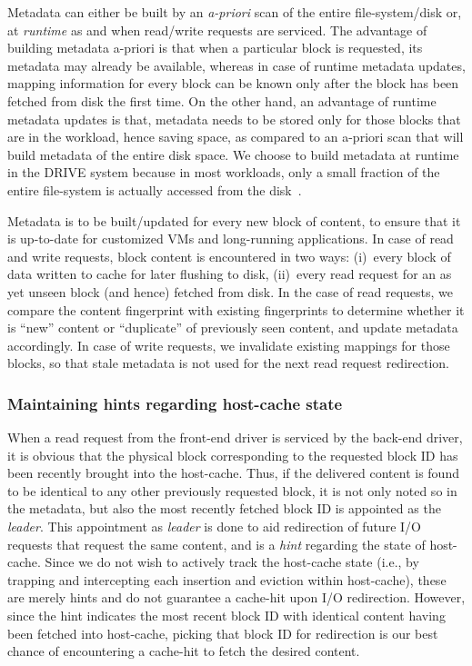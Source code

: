 Metadata can either be built by an \textit{a-priori} scan of the entire
file-system/disk or, at \textit{runtime} as and when read/write
requests are serviced. The advantage of building metadata a-priori is that
when a particular block is requested, its metadata may already be
available,
whereas in case of runtime metadata updates, mapping information for
every block can be known only after the block has been fetched from disk
the first time.
On the other hand, an advantage of runtime metadata updates is that,
metadata needs to be stored only for those blocks that are in the workload,
hence saving space, as compared to an a-priori scan that will build metadata
of the entire disk space. We choose to build metadata at runtime in the
DRIVE system because in most workloads, only a small fraction of the 
entire file-system is actually accessed from the disk~\cite{iodedup}.

Metadata is to be built/updated for every new block of content, to ensure that
it is up-to-date for customized VMs and long-running applications.
In case of read and write requests, block content is encountered in two ways:
(i)~every block of data written to cache for later flushing to disk,
(ii)~every read request for an as yet unseen block (and hence) fetched
from disk. 
In the case of read requests, we compare the 
content fingerprint
with existing fingerprints to determine
whether it is ``new'' content or ``duplicate'' of previously seen content,
and update metadata accordingly.
In case of write requests, we invalidate existing mappings for those blocks,
so that stale metadata is not used for the next read request redirection.

\subsubsection{Maintaining hints regarding host-cache state}
When a read request from the front-end driver is serviced by the back-end
driver, it is obvious that the physical block
corresponding to the requested
block ID has been recently brought into the host-cache. Thus, if the delivered
content is found to be identical to any other previously requested block, it 
is not only noted 
so in the metadata, but also the most recently fetched block ID is appointed
as the \textit{leader}. This appointment as \textit{leader} is done to aid
redirection of future I/O requests that request the same content, and is
a \textit{hint} regarding the state of host-cache.
Since we do not wish to actively track the host-cache state (i.e., by
trapping and intercepting each insertion and eviction within host-cache), 
these are merely hints and do not guarantee a cache-hit upon I/O redirection.
However, since the hint indicates the most recent block ID with identical
content having been fetched into host-cache, picking that block ID for 
redirection is our best chance of encountering a cache-hit to fetch the 
desired content. 


